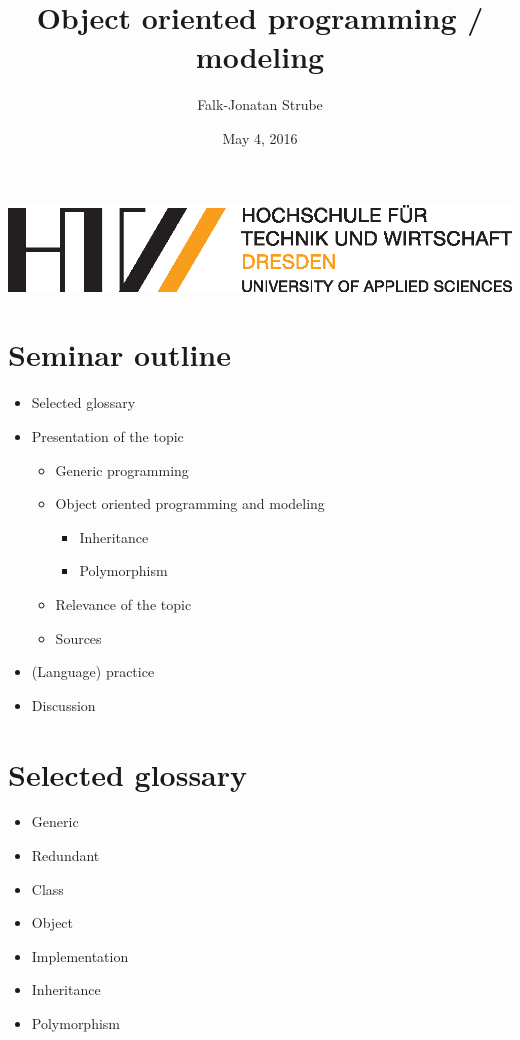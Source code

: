 



\title{Object oriented programming / modeling}
\author{Falk-Jonatan Strube}
\date{May 4, 2016} 



\begin{frame}[plain]
\begin{center}
\includegraphics[width=.3\textwidth]{../../../_LaTeX_master/HTW.eps}
\end{center}
\maketitle
\end{frame}
\section*{Seminar outline}
\begin{frame}
\begin{itemize}
\setlength\itemsep{1em}
\item Selected glossary
\item Presentation of the topic
\begin{itemize}
\item Generic programming
\item Object oriented programming and modeling
\begin{itemize}
\item Inheritance
\item Polymorphism
\end{itemize}
\item Relevance of the topic
\item Sources
\end{itemize}
\item (Language) practice
\item Discussion
\end{itemize}
\end{frame}

\section*{Selected glossary}
\begin{frame}
\begin{itemize}
\setlength\itemsep{1em}
\item Generic
\item Redundant
\item Class
\item Object
\item Implementation
\item Inheritance
\item Polymorphism
\end{itemize}
\end{frame}

